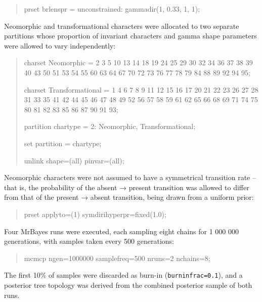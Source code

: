 \documentclass[]{book}
\theoremstyle{definition}
\theoremstyle{definition}
\theoremstyle{definition}
\theoremstyle{remark}
\begin{document}
\begin{quote}
prset brlenspr = unconstrained: gammadir(1, 0.33, 1, 1);
\end{quote}

Neomorphic and transformational characters \citep[sensu][]{Sereno2007}
were allocated to two separate partitions whose proportion of invariant
characters and gamma shape parameters were allowed to vary
independently:

\begin{quote}
charset Neomorphic = 2 3 5 10 13 14 18 19 24 25 29 30 32 34 36 37 38 39
40 43 50 51 53 54 55 60 63 64 67 70 72 73 76 77 78 79 84 88 89 92 94 95;

charset Transformational = 1 4 6 7 8 9 11 12 15 16 17 20 21 22 23 26 27
28 31 33 35 41 42 44 45 46 47 48 49 52 56 57 58 59 61 62 65 66 68 69 71
74 75 80 81 82 83 85 86 87 90 91 93;

partition chartype = 2: Neomorphic, Transformational;

set partition = chartype;

unlink shape=(all) pinvar=(all);
\end{quote}

Neomorphic characters were not assumed to have a symmetrical transition
rate -- that is, the probability of the absent → present transition was
allowed to differ from that of the present → absent transition, being
drawn from a uniform prior:

\begin{quote}
prset applyto=(1) symdirihyperpr=fixed(1.0);
\end{quote}

Four MrBayes runs were executed, each sampling eight chains for 1 000
000 generations, with samples taken every 500 generations:

\begin{quote}
mcmcp ngen=1000000 samplefreq=500 nruns=2 nchains=8;
\end{quote}

The first 10\% of samples were discarded as burn-in
(\texttt{burninfrac=0.1}), and a posterior tree topology was derived
from the combined posterior sample of both runs.
\end{document}
